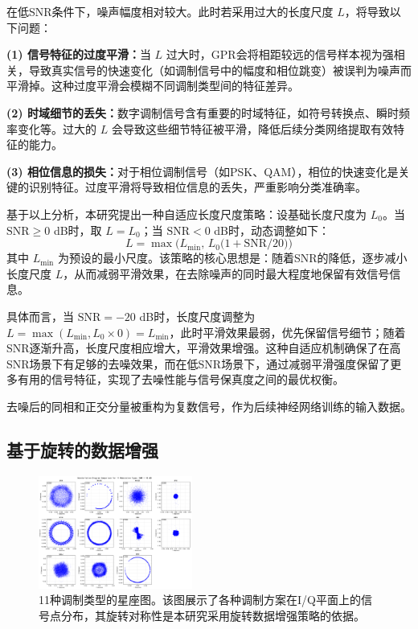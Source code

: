\documentclass[conference]{IEEEtran}
\begin{document}
在低SNR条件下，噪声幅度相对较大。此时若采用过大的长度尺度 $L$，将导致以下问题：

\textbf{(1) 信号特征的过度平滑：}当 $L$ 过大时，GPR会将相距较远的信号样本视为强相关，导致真实信号的快速变化（如调制信号中的幅度和相位跳变）被误判为噪声而平滑掉。这种过度平滑会模糊不同调制类型间的特征差异。

\textbf{(2) 时域细节的丢失：}数字调制信号含有重要的时域特征，如符号转换点、瞬时频率变化等。过大的 $L$ 会导致这些细节特征被平滑，降低后续分类网络提取有效特征的能力。

\textbf{(3) 相位信息的损失：}对于相位调制信号（如PSK、QAM），相位的快速变化是关键的识别特征。过度平滑将导致相位信息的丢失，严重影响分类准确率。

基于以上分析，本研究提出一种自适应长度尺度策略：设基础长度尺度为 $L_0$。当 $\mathrm{SNR}\ge0$ dB时，取 $L=L_0$；当 $\mathrm{SNR}<0$ dB时，动态调整如下：
\begin{equation}
L = \max\bigl(L_{\min},\,L_0\bigl(1+\mathrm{SNR}/20\bigr)\bigr)
\end{equation}
其中 $L_{\min}$ 为预设的最小尺度。该策略的核心思想是：随着SNR的降低，逐步减小长度尺度 $L$，从而减弱平滑效果，在去除噪声的同时最大程度地保留有效信号信息。

具体而言，当 $\mathrm{SNR}=-20$ dB时，长度尺度调整为 $L=\max(L_{\min}, L_0 \times 0)=L_{\min}$，此时平滑效果最弱，优先保留信号细节；随着SNR逐渐升高，长度尺度相应增大，平滑效果增强。这种自适应机制确保了在高SNR场景下有足够的去噪效果，而在低SNR场景下，通过减弱平滑强度保留了更多有用的信号特征，实现了去噪性能与信号保真度之间的最优权衡。

去噪后的同相和正交分量被重构为复数信号，作为后续神经网络训练的输入数据。

\subsection{基于旋转的数据增强}

\begin{figure}[htbp]
\centering
\includegraphics[width=0.45\textwidth]{figure/constellation.png}
\caption{11种调制类型的星座图。该图展示了各种调制方案在I/Q平面上的信号点分布，其旋转对称性是本研究采用旋转数据增强策略的依据。}
\label{fig:constellation}
\end{figure}
\end{document}

